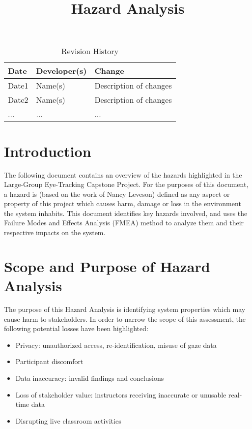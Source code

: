 \documentclass{article}
\title{Hazard Analysis\\\progname}
\author{\authname}
\date{}
\begin{document}
\maketitle
\thispagestyle{empty}

\newpage
{}

\begin{table}[hp]
\caption{Revision History} \label{TblRevisionHistory}
\begin{tabularx}{\textwidth}{llX}
\toprule
\textbf{Date} & \textbf{Developer(s)} & \textbf{Change}\\
\midrule
Date1 & Name(s) & Description of changes\\
Date2 & Name(s) & Description of changes\\
... & ... & ...\\
\bottomrule
\end{tabularx}
\end{table}

\newpage
\tableofcontents

\newpage
{}

\section{Introduction}
The following document contains an overview of the hazards highlighted in the Large-Group Eye-Tracking Capstone Project. For the purposes of this document, a hazard is (based on the work of Nancy Leveson) defined as any aspect or property of this project which causes harm, damage or loss in the environment the system inhabits. This document identifies key hazards involved, and uses the Failure Modes and Effects Analysis (FMEA) method to analyze them and their respective impacts on the system.

\section{Scope and Purpose of Hazard Analysis}
The purpose of this Hazard Analysis is identifying system properties which may cause harm to stakeholders. In order to narrow the scope of this assessment, the following potential losses have been highlighted:
\begin{itemize}
    \item Privacy: unauthorized access, re-identification, misuse of gaze data
    \item Participant discomfort
    \item Data inaccuracy: invalid findings and conclusions
    \item Loss of stakeholder value: instructors receiving inaccurate or unusable real-time data
    \item Disrupting live classroom activities
\end{itemize}
\end{document}
